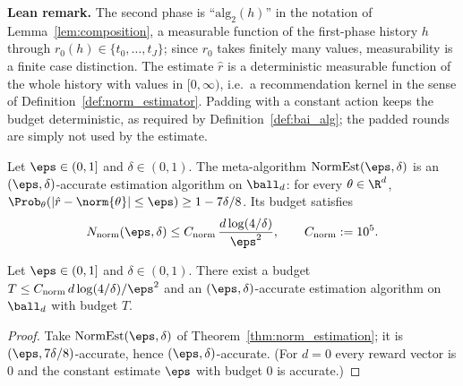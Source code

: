 \textbf{Lean remark.} The second phase is ``$\mathrm{alg}_2(h)$'' in the notation of
Lemma~\ref{lem:composition}, a measurable function of the first-phase history $h$ through
$r_0(h) \in \{t_0,\dots,t_J\}$; since $r_0$ takes finitely many values, measurability is a
finite case distinction. The estimate $\hat r$ is a deterministic measurable function of the
whole history with values in $[0,\infty)$, i.e.\ a recommendation kernel in the sense of
Definition~\ref{def:norm_estimator}. Padding with a constant action keeps the budget
deterministic, as required by Definition~\ref{def:bai_alg}; the padded rounds are simply
not used by the estimate.

\begin{theorem}\label{thm:norm_estimation}
\leanok
{}
Let $\eps \in (0,1]$ and $\delta \in (0,1)$. The meta-algorithm $\mathrm{NormEst}(\eps,\delta)$
is an $(\eps,\delta)$-accurate estimation algorithm on $\ball_d$: for every
$\theta \in \R^d$, $\Prob_\theta(|\hat r - \norm{\theta}| \le \eps) \ge 1 - 7\delta/8$. Its
budget satisfies
\[
  N_{\mathrm{norm}}(\eps,\delta) \le C_{\mathrm{norm}}\,\frac{d\log(4/\delta)}{\eps^2},
  \qquad C_{\mathrm{norm}} := 10^5 .
\]
\end{theorem}

\begin{corollary}\label{cor:norm_estimation_exists}
\leanok
{}
Let $\eps \in (0,1]$ and $\delta \in (0,1)$. There exist a budget
$T \le C_{\mathrm{norm}}\, d\log(4/\delta)/\eps^2$ and an $(\eps,\delta)$-accurate estimation
algorithm on $\ball_d$ with budget $T$.
\end{corollary}
\begin{proof}
\leanok
{}
Take $\mathrm{NormEst}(\eps,\delta)$ of Theorem~\ref{thm:norm_estimation}; it is
$(\eps, 7\delta/8)$-accurate, hence $(\eps,\delta)$-accurate. (For $d = 0$ every reward
vector is $0$ and the constant estimate $\eps$ with budget $0$ is accurate.)
\end{proof}

